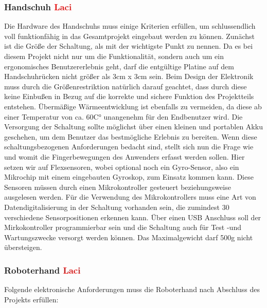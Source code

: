 \documentclass[11pt]{article}
\begin{document}
\subsubsection{Handschuh \textcolor{red}{Laci}}
Die Hardware des Handschuhs muss einige Kriterien erfüllen, um schlussendlich voll funktionfähig in das Gesamtprojekt eingebaut 
werden zu können. Zunächst ist die Größe der Schaltung, als mit der wichtigste Punkt zu nennen. Da es bei diesem Projekt nicht nur
um die Funktionalität, sondern auch um ein ergonomisches Benutzererlebnis geht, darf die entgültige Platine auf dem Handschuhrücken
nicht größer als 3cm x 3cm sein. Beim Design der Elektronik muss durch die Größenrestriktion natürlich darauf geachtet, dass durch
diese keine Einbußen in Bezug auf die korrekte und sichere Funktion des Projektteils entstehen. Übermäßige Wärmeentwicklung ist 
ebenfalls zu vermeiden, da diese ab einer Temperatur von ca. 60C° unangenehm für den Endbenutzer wird. Die Versorgung der Schaltung
sollte möglichst über einen kleinen und portablen Akku geschehen, um dem Benutzer das bestmögliche Erlebnis zu bereiten. Wenn diese
schaltungsbezogenen Anforderungen bedacht sind, stellt sich nun die Frage wie und womit die Fingerbewegungen des Anwenders erfasst 
werden sollen. Hier setzen wir auf Flexsensoren, wobei optional noch ein Gyro-Sensor, also ein Mikrochip mit einem eingebauten
Gyroskop, zum Einsatz kommen kann. Diese Sensoren müssen durch einen Mikrokontroller gesteuert beziehungsweise ausgelesen werden.
Für die Verwendung des Mikrokontrollers muss eine Art von Datendigitalisierung in der Schaltung vorhanden sein, die zumindest 30
verschiedene Sensorpositionen erkennen kann. Über einen USB Anschluss soll der Mirkokontroller programmierbar sein und die Schaltung
auch für Test -und Wartungszwecke versorgt werden können. Das Maximalgewicht darf 500g nicht übersteigen.

\subsubsection{Roboterhand \textcolor{red}{Laci}}
Folgende elektronische Anforderungen muss die Roboterhand nach Abschluss des Projekts erfüllen:
\end{document}

